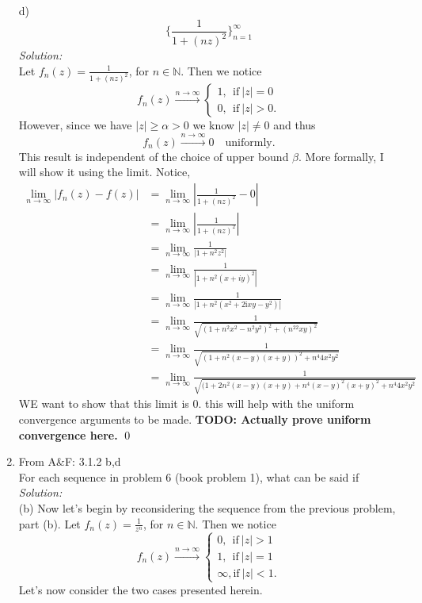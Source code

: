 \documentclass[10pt]{amsart}
\newcommand{\I}{\mathrm{i}}
\theoremstyle{nonumberplain}
\begin{document}
\begin{enumerate}[label={\bf {\arabic*}:}]
\newpage

\noindent
d) $$ \bigg\{ \frac 1 {1 + (nz)^2} \bigg\}_{n=1}^{\infty} $$
\textit{Solution:}\\
Let $f_n(z) = \frac 1 {1 + (nz)^2}$, for $n \in \mathbb N$. Then we notice
$$
f_n(z) \overset{n \to \infty}{\longrightarrow} \begin{cases}
1, \: \: \text{if}\: |z| = 0 \\
0, \: \: \text{if}\: |z| > 0.
\end{cases}
$$
However, since we have $|z| \geq \alpha > 0$ we know $|z| \neq 0$ and thus
$$
f_n(z) \overset{n \to \infty}{\longrightarrow} 0 \quad \text{uniformly}.
$$
This result is independent of the choice of upper bound $\beta$.
More formally, I will show it using the limit.
Notice,
\begin{align*}
\lim_{n \rightarrow \infty} \left| f_n(z) - f(z) \right|
	&= \lim_{n \rightarrow \infty} \left| \frac 1 {1 + (nz)^2} - 0 \right| \\
	&= \lim_{n \rightarrow \infty} \left| \frac 1 {1 + (nz)^2}\right| \\
	&= \lim_{n \rightarrow \infty} \frac 1 {|1 + n^2z^2|} \\
	&= \lim_{n \rightarrow \infty} \frac 1 {|1 + n^2(x + iy)^2|} \\
	&= \lim_{n \rightarrow \infty} \frac 1 {|1 + n^2(x^2 + 2\I x y - y^2) |} \\
	&= \lim_{n \rightarrow \infty} \frac 1 {\sqrt{(1 + n^2x^2 - n^2y^2)^2 + (n^22 x y)^2 }} \\
	&= \lim_{n \rightarrow \infty} \frac 1 {\sqrt{(1 + n^2(x - y)(x + y))^2 + n^4 4 x^2 y^2 }} \\
	&= \lim_{n \rightarrow \infty} \frac 1 {\sqrt{(1 + 2n^2(x - y)(x + y) + n^4(x - y)^2(x + y)^2 + n^4 4 x^2 y^2 }}
\end{align*}
WE want to show that this limit is 0. this will help with the uniform convergence arguments to be made.
\textbf{TODO: Actually prove uniform convergence here.}
\qed
\newpage

\item From A\&F: 3.1.2 b,d \\
For each sequence in problem 6 (book problem 1), what can be said if \\
\textit{Solution:} \\
(b) Now let's begin by reconsidering the sequence from the previous problem, part (b).
Let $f_n(z) = \frac 1 {z^n}$, for $n \in \mathbb N$. Then we notice
$$
f_n(z) \overset{n \to \infty}{\longrightarrow} \begin{cases}
0, \: \: \text{if}\: |z| > 1 \\
1, \: \: \text{if}\: |z| = 1 \\
\infty, \text{if}\: |z| < 1.
\end{cases}
$$
Let's now consider the two cases presented herein. \\


\end{enumerate}
\end{document}
